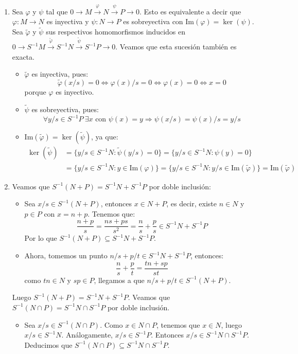 \documentclass[twoside]{article}
\begin{document}
\begin{solucion}\mbox{}
\begin{enumerate}
	\item Sea $φ$ y $ψ$ tal que $0 \to M \xrightarrow{φ} N \xrightarrow{ψ} P \to 0$. Esto es equivalente a decir que $φ : M \to N$ es inyectiva y $ψ : N \to P$ es sobreyectiva con $\text{Im}(φ) = \ker(ψ)$. Sea $\tilde{φ}$ y $\tilde{ψ}$ sus respectivos homomorfismos inducidos en $0 \to S^{-1} M \xrightarrow{\tilde{φ}} S^{-1}N \xrightarrow{\tilde{ψ}} S^{-1}P \to 0$. Veamos que esta sucesión también es exacta.
	\begin{itemize}
	\item $\tilde{φ}$ es inyectiva, pues:
	\[ \tilde{φ}(x/s) = 0 \Leftrightarrow φ(x)/s = 0 \Leftrightarrow φ(x) = 0 \Leftrightarrow x = 0 \]
	porque $φ$ es inyectivo.

	\item $\tilde{ψ}$ es sobreyectiva, pues:
	\[ \forall y/s \in S^{-1}P\ \exists x\text{ con }ψ(x)=y \Rightarrow ψ(x/s) = ψ(x)/s = y/s \]

	\item $\text{Im}(\tilde{φ}) = \ker(\tilde{ψ})$, ya que:
	\begin{align*}
		\ker(\tilde{ψ}) & = \{y/s \in S^{-1}N : \tilde{ψ}(y/s) = 0\} = \{y/s \in S^{-1}N : ψ(y) = 0\}\\
		& = \{y/s \in S^{-1}N : y \in \text{Im}(φ)\} = \{y/s \in S^{-1}N : y/s \in \text{Im}(\tilde{φ})\} = \text{Im}(\tilde{φ})
	\end{align*}
\end{itemize}

	\item Veamos que $S^{-1}(N+P) = S^{-1}N + S^{-1}P$ por doble inclusión:
	\begin{itemize}
	\item Sea $x/s \in S^{-1}(N+P)$, entonces $x \in N+P$, es decir, existe $n \in N$ y $p \in P$ con $x=n+p$. Tenemos que:
	\[ \frac{n+p}{s} = \frac{ns+ps}{s^2} = \frac{n}{s}+\frac{p}{s} \in S^{-1}N+S^{-1}P \]
	Por lo que $S^{-1}(N+P) \subseteq S^{-1}N+S^{-1}P$.

	\item Ahora, tomemos un punto $n/s+p/t \in S^{-1}N+S^{-1}P$, entonces:
	\[ \frac{n}{s}+\frac{p}{t} = \frac{tn+sp}{st} \]
	como $tn \in N$ y $sp \in P$, llegamos a que $n/s+p/t \in S^{-1}(N+P)$.
	\end{itemize}
	Luego $S^{-1}(N+P) = S^{-1}N+S^{-1}P$. Veamos que $S^{-1}(N \cap P) = S^{-1}N \cap S^{-1}P$ por doble inclusión.
	\begin{itemize}
		\item Sea $x/s \in S^{-1}(N \cap P)$. Como $x \in N \cap P$, tenemos que $x \in N$, luego $x/s \in S^{-1}N$. Análogamente, $x/s \in S^{-1}P$. Entonces $x/s \in S^{-1}N \cap S^{-1}P$. Deducimos que $S^{-1}(N \cap P) \subseteq S^{-1}N \cap S^{-1}P$.


\end{itemize}
\end{enumerate}
\end{solucion}
\end{document}
